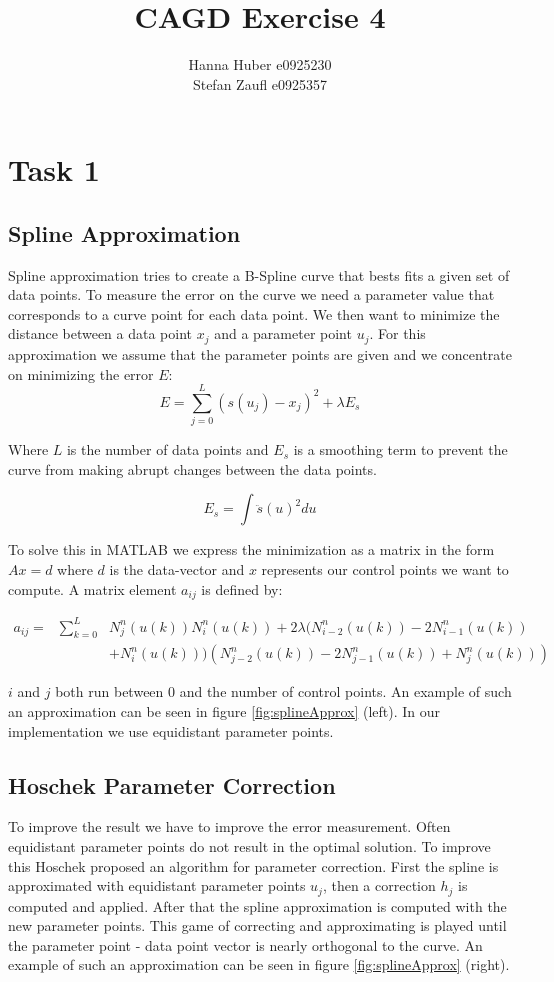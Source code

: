 \documentclass[12pt,a4paper]{article}
\title{CAGD Exercise 4}
\author{Hanna Huber e0925230\\Stefan Zaufl e0925357}
\begin{document}
\maketitle
\section{Task 1}
\subsection{Spline Approximation}
Spline approximation tries to create a B-Spline curve that bests fits a given set of data points. To measure the error on the curve we need a parameter value that corresponds to a curve point for each data point. We then want to minimize the distance between a data point $x_j$ and a parameter point $u_j$.
For this approximation we assume that the parameter points are given and we concentrate on minimizing the error $E$:\begin{equation}
E = \sum_{j=0}^L(s(u_j) - x_j)^2 + \lambda E_s
\end{equation}

Where $L$ is the number of data points and $E_s$ is a smoothing term to prevent the curve from making abrupt changes between the data points.

\begin{equation}
E_s = \int \ddot{s}(u)^2 du
\end{equation}

To solve this in MATLAB we express the minimization as a matrix in the form $Ax=d$ where $d$ is the data-vector and $x$ represents our control points we want to compute. A matrix element $a_{ij}$ is defined by:

\begin{eqnarray*}
a_{ij} = & \sum_{k=0}^L & N^n_j(u(k)) N^n_i(u(k)) + 2\lambda (N^n_{i-2}(u(k)) - 2N^n_{i-1}(u(k))\\
 & & + N^n_i(u(k))) ( N^n_{j-2}(u(k)) - 2N^n_{j-1}(u(k)) + N^n_j(u(k)))
\end{eqnarray*}

$i$ and $j$ both run between $0$ and the number of control points. An example of such an approximation can be seen in figure \ref{fig:splineApprox} (left). In our implementation we use equidistant parameter points.

\subsection{Hoschek Parameter Correction}
To improve the result we have to improve the error measurement. Often equidistant parameter points do not result in the optimal solution. To improve this Hoschek proposed an algorithm for parameter correction. First the spline is approximated with equidistant parameter points $u_j$, then a correction $h_j$ is computed and applied. After that the spline approximation is computed with the new parameter points. This game of correcting and approximating is played until the parameter point - data point vector is nearly orthogonal to the curve. An example of such an approximation can be seen in figure \ref{fig:splineApprox} (right).
\end{document}
